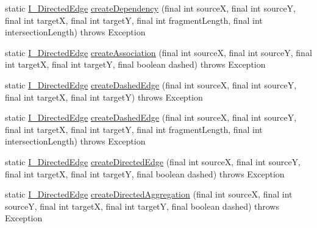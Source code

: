 \begin{DoxyCompactItemize}
\item 
static \hyperlink{interfaceorg_1_1tzi_1_1use_1_1gui_1_1views_1_1diagrams_1_1edges_1_1_i___directed_edge}{I\-\_\-\-Directed\-Edge} \hyperlink{classorg_1_1tzi_1_1use_1_1gui_1_1views_1_1diagrams_1_1edges_1_1_directed_edge_factory_a8227d78cf75e9e7ae167558ad87aa1bf}{create\-Dependency} (final int source\-X, final int source\-Y, final int target\-X, final int target\-Y, final int fragment\-Length, final int intersection\-Length)  throws Exception 
\item 
static \hyperlink{interfaceorg_1_1tzi_1_1use_1_1gui_1_1views_1_1diagrams_1_1edges_1_1_i___directed_edge}{I\-\_\-\-Directed\-Edge} \hyperlink{classorg_1_1tzi_1_1use_1_1gui_1_1views_1_1diagrams_1_1edges_1_1_directed_edge_factory_a3382a17b22f78c6eac041f7d45f693fb}{create\-Association} (final int source\-X, final int source\-Y, final int target\-X, final int target\-Y, final boolean dashed)  throws Exception 
\item 
static \hyperlink{interfaceorg_1_1tzi_1_1use_1_1gui_1_1views_1_1diagrams_1_1edges_1_1_i___directed_edge}{I\-\_\-\-Directed\-Edge} \hyperlink{classorg_1_1tzi_1_1use_1_1gui_1_1views_1_1diagrams_1_1edges_1_1_directed_edge_factory_ae56d5943249f0e339c0e954a749475e9}{create\-Dashed\-Edge} (final int source\-X, final int source\-Y, final int target\-X, final int target\-Y)  throws Exception 
\item 
static \hyperlink{interfaceorg_1_1tzi_1_1use_1_1gui_1_1views_1_1diagrams_1_1edges_1_1_i___directed_edge}{I\-\_\-\-Directed\-Edge} \hyperlink{classorg_1_1tzi_1_1use_1_1gui_1_1views_1_1diagrams_1_1edges_1_1_directed_edge_factory_ac6666b33406d23a6805a6000ddd7977a}{create\-Dashed\-Edge} (final int source\-X, final int source\-Y, final int target\-X, final int target\-Y, final int fragment\-Length, final int intersection\-Length)  throws Exception 
\item 
static \hyperlink{interfaceorg_1_1tzi_1_1use_1_1gui_1_1views_1_1diagrams_1_1edges_1_1_i___directed_edge}{I\-\_\-\-Directed\-Edge} \hyperlink{classorg_1_1tzi_1_1use_1_1gui_1_1views_1_1diagrams_1_1edges_1_1_directed_edge_factory_a319e98c0cc41e74d3d9a257b8ae0dff7}{create\-Directed\-Edge} (final int source\-X, final int source\-Y, final int target\-X, final int target\-Y, final boolean dashed)  throws Exception 
\item 
static \hyperlink{interfaceorg_1_1tzi_1_1use_1_1gui_1_1views_1_1diagrams_1_1edges_1_1_i___directed_edge}{I\-\_\-\-Directed\-Edge} \hyperlink{classorg_1_1tzi_1_1use_1_1gui_1_1views_1_1diagrams_1_1edges_1_1_directed_edge_factory_a842fc043e1acafcd4d3510e1eb555517}{create\-Directed\-Aggregation} (final int source\-X, final int source\-Y, final int target\-X, final int target\-Y, final boolean dashed)  throws Exception 

\end{DoxyCompactItemize}
